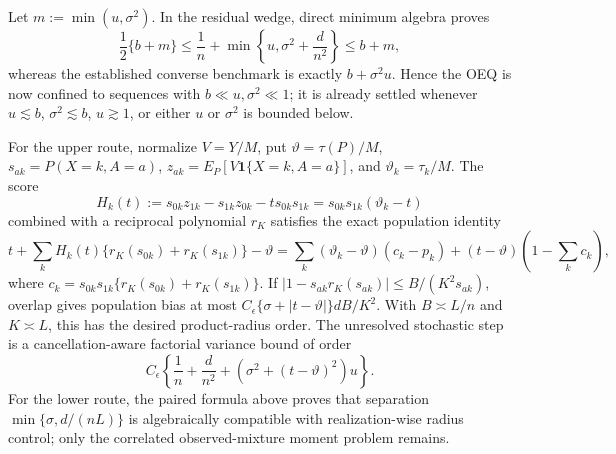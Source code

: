 Let \(m:=\min(u,\sigma^2)\).  In the residual wedge, direct minimum algebra proves
\[
 \frac12\{b+m\}\le
 \frac1n+\min\left\{u,\sigma^2+\frac d{n^2}\right\}
 \le b+m,
\]
whereas the established converse benchmark is exactly \(b+\sigma^2u\).  Hence the OEQ is now confined to sequences with \(b\ll u,\sigma^2\ll1\); it is already settled whenever \(u\lesssim b\), \(\sigma^2\lesssim b\), \(u\gtrsim1\), or either \(u\) or \(\sigma^2\) is bounded below.

For the upper route, normalize \(V=Y/M\), put \(\vartheta=\tau(P)/M\), \(s_{ak}=P(X=k,A=a)\), \(z_{ak}=E_P[V\mathbf 1\{X=k,A=a\}]\), and \(\vartheta_k=\tau_k/M\).  The score
\[
 H_k(t):=s_{0k}z_{1k}-s_{1k}z_{0k}-t s_{0k}s_{1k}
 =s_{0k}s_{1k}(\vartheta_k-t)
\]
combined with a reciprocal polynomial \(r_K\) satisfies the exact population identity
\[
 t+\sum_kH_k(t)\{r_K(s_{0k})+r_K(s_{1k})\}-\vartheta
 =\sum_k(\vartheta_k-\vartheta)(c_k-p_k)
 +(t-\vartheta)\left(1-\sum_kc_k\right),
\]
where \(c_k=s_{0k}s_{1k}\{r_K(s_{0k})+r_K(s_{1k})\}\).  If \(|1-s_{ak}r_K(s_{ak})|\le B/(K^2s_{ak})\), overlap gives population bias at most \(C_{\epsilon}\{\sigma+|t-\vartheta|\}dB/K^2\).  With \(B\asymp L/n\) and \(K\asymp L\), this has the desired product-radius order.  The unresolved stochastic step is a cancellation-aware factorial variance bound of order
\[
 C_{\epsilon}\left\{\frac1n+\frac d{n^2}+
 (\sigma^2+(t-\vartheta)^2)u\right\}.
\]
For the lower route, the paired formula above proves that separation \(\min\{\sigma,d/(nL)\}\) is algebraically compatible with realization-wise radius control; only the correlated observed-mixture moment problem remains.